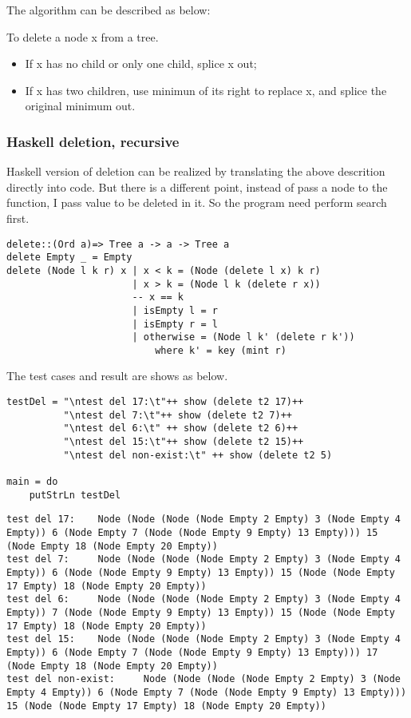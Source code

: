 \documentclass{article}
\begin{document}
The algorithm can be described as below:

To delete a node x from a tree.
\begin{itemize}
\item If x has no child or only one child, splice x out;
\item If x has two children, use minimun of its right to replace x, 
and splice the original minimum out.
\end{itemize}

\subsubsection*{Haskell deletion, recursive}

Haskell version of deletion can be realized by translating the above descrition
directly into code. But there is a different point, instead of pass a node to the
function, I pass value to be deleted in it. So the program need perform search first.

\lstset{language=Haskell}
\begin{lstlisting}
delete::(Ord a)=> Tree a -> a -> Tree a
delete Empty _ = Empty
delete (Node l k r) x | x < k = (Node (delete l x) k r)
                      | x > k = (Node l k (delete r x))
                      -- x == k
                      | isEmpty l = r
                      | isEmpty r = l
                      | otherwise = (Node l k' (delete r k')) 
                          where k' = key (mint r)
\end{lstlisting}

The test cases and result are shows as below.

\begin{lstlisting}
testDel = "\ntest del 17:\t"++ show (delete t2 17)++
          "\ntest del 7:\t"++ show (delete t2 7)++
          "\ntest del 6:\t" ++ show (delete t2 6)++
          "\ntest del 15:\t"++ show (delete t2 15)++
          "\ntest del non-exist:\t" ++ show (delete t2 5)

main = do
    putStrLn testDel
\end{lstlisting}

\begin{verbatim}
test del 17:    Node (Node (Node (Node Empty 2 Empty) 3 (Node Empty 4 
Empty)) 6 (Node Empty 7 (Node (Node Empty 9 Empty) 13 Empty))) 15 
(Node Empty 18 (Node Empty 20 Empty))
test del 7:     Node (Node (Node (Node Empty 2 Empty) 3 (Node Empty 4 
Empty)) 6 (Node (Node Empty 9 Empty) 13 Empty)) 15 (Node (Node Empty 
17 Empty) 18 (Node Empty 20 Empty))
test del 6:     Node (Node (Node (Node Empty 2 Empty) 3 (Node Empty 4 
Empty)) 7 (Node (Node Empty 9 Empty) 13 Empty)) 15 (Node (Node Empty 
17 Empty) 18 (Node Empty 20 Empty))
test del 15:    Node (Node (Node (Node Empty 2 Empty) 3 (Node Empty 4 
Empty)) 6 (Node Empty 7 (Node (Node Empty 9 Empty) 13 Empty))) 17 
(Node Empty 18 (Node Empty 20 Empty))
test del non-exist:     Node (Node (Node (Node Empty 2 Empty) 3 (Node 
Empty 4 Empty)) 6 (Node Empty 7 (Node (Node Empty 9 Empty) 13 Empty))) 
15 (Node (Node Empty 17 Empty) 18 (Node Empty 20 Empty))
\end{verbatim}
\end{document}
